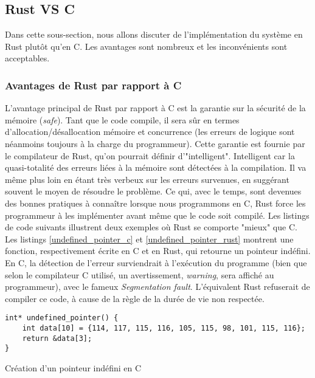 \subsection{Rust VS C}
Dans cette sous-section, nous allons discuter de l'implémentation du système en Rust plutôt qu'en 
C. Les avantages sont nombreux et les inconvénients sont acceptables.

\subsubsection{Avantages de Rust par rapport à C}
L'avantage principal de Rust par rapport à C est la garantie sur la sécurité de la mémoire (\textit{safe}). 
Tant que le code compile, il sera sûr en termes d'allocation/désallocation mémoire et concurrence 
(les erreurs de logique sont néanmoins toujours à la charge du programmeur). Cette garantie est 
fournie par le compilateur de Rust, qu'on pourrait définir d'"intelligent". Intelligent car la 
quasi-totalité des erreurs liées à la mémoire sont détectées à la compilation. Il va même plus 
loin en étant très verbeux sur les erreurs survenues, en suggérant souvent le moyen de résoudre 
le problème. Ce qui, avec le temps, sont devenues des bonnes pratiques à connaître lorsque 
nous programmons en C, Rust force les programmeur à les implémenter avant même que le code soit 
compilé. Les listings de code suivants illustrent deux exemples où Rust se comporte "mieux" que 
C. Les listings \ref{undefined_pointer_c} et \ref{undefined_pointer_rust} montrent une fonction, 
respectivement écrite en C et en Rust, qui retourne un pointeur indéfini. En C, la détection de 
l'erreur surviendrait à l'exécution du programme (bien que selon le compilateur C utilisé, un 
avertissement, \textit{warning}, sera affiché au programmeur), avec le fameux \textit{Segmentation fault}.
L'équivalent Rust refuserait de compiler ce code, à cause de la règle de la durée de vie non respectée.
\bigbreak
\begin{code}
    \begin{verbatim}
int* undefined_pointer() {
    int data[10] = {114, 117, 115, 116, 105, 115, 98, 101, 115, 116};
    return &data[3];
}
    \end{verbatim}
    \caption{Création d'un pointeur indéfini en C}
    \label{undefined_pointer_c}
\end{code}
